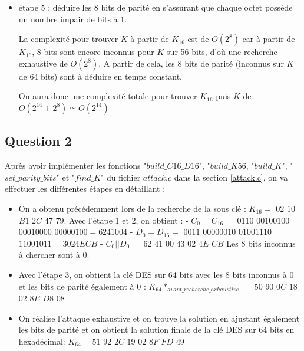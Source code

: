\documentclass[11pt]{article}
\begin{document}
\begin{itemize}
	\item étape 5 : déduire les 8 bits de parité en s'assurant que chaque octet possède un nombre impair de bits à 1. \newline
	
	La complexité pour trouver $K$ à partir de $K_{16}$ est de $O(2^8)$ car à partir de $K_{16}$, 8 bits sont encore inconnus pour $K$ sur 56 bits, d'où une recherche exhaustive de $O(2^8)$. A partir de cela, les 8 bits de parité (inconnus sur $K$ de 64 bits) sont à déduire en temps constant. \newline
	
	On aura donc une complexité totale pour trouver $K_{16}$ puis $K$ de $O(2^{14}+2^{8}) \simeq O(2^{14})$
	
	
\end{itemize}

\subsection{Question 2}

Après avoir implémenter les fonctions "$build\_C16\_D16$", "$build\_K56$, "$build\_K$", "$set\_parity\_bits$" et "$find\_K$" du fichier $attack.c$ dans la section \ref{attack.c}, on va effectuer les différentes étapes en détaillant : 

\begin{itemize}

\item On a obtenu précédemment lors de la recherche de la sous clé : $K_{16}= $ $02$ $10$ $B1$ $2C$ $47$ $79$. \newline \newline
Avec l'étape 1 et 2, on obtient : \newline 
- $C_{0}=C_{16}=$ $0110$ $00100100$ $00010000$ $00000100= 6241004$ \newline 
- $D_{0}=D_{16}=$ $0011$ $00000010$ $01001110$ $11001011= 3024ECB$ \newline
- $C_{0}||D_{0}=$ $62$ $41$ $00$ $43$ $02$ $4E$ $CB$ \newline
Les 8 bits inconnus à chercher sont à $0$. \newline

\item Avec l'étape 3, on obtient la clé DES sur 64 bits avec les 8 bits inconnus à 0 et les bits de parité également à 0 : $K_{64}*_{avant\_recherche\_exhaustive}=$ $50$ $90$ $0C$ $18$ $02$ $8E$ $D8$ $08$ \newline

\item On réalise l'attaque exhaustive et on trouve la solution en ajustant également les bits de parité et on obtient la solution finale de la clé DES sur 64 bits en hexadécimal: \newline 
\color{red}
$K_{64}=51$ $92$ $2C$ $19$ $02$ $8F$ $FD$ $49$
\color{black}

\end{itemize}
\end{document}
